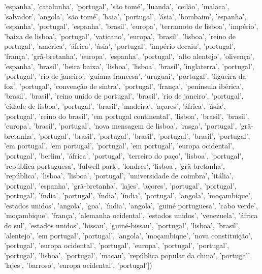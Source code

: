 \documentclass{article}
\begin{document}
\begin{itemize}
'espanha', 'catalunha', 'portugal', 'são tomé', 'luanda', 'ceilão', 'malaca', 'salvador', 'angola', 'são tomé', 'haia', 'portugal', 'ásia', 'bombaim', 'espanha', 'espanha', 'portugal', 'espanha', 'brasil', 'europa', 'terramoto de lisboa', 'império', 'baixa de lisboa', 'portugal', 'vaticano', 'europa', 'brasil', 'lisboa', 'reino de portugal', 'américa', 'áfrica', 'ásia', 'portugal', 'império decaiu', 'portugal', 'frança', 'grã-bretanha', 'europa', 'espanha', 'portugal', 'alto alentejo', 'olivença', 'espanha', 'brasil', 'beira baixa', 'lisboa', 'lisboa', 'brasil', 'inglaterra', 'portugal', 'portugal', 'rio de janeiro', 'guiana francesa', 'uruguai', 'portugal', 'figueira da foz', 'portugal', 'convenção de sintra', 'portugal', 'frança', 'península ibérica', 'brasil', 'brasil', 'reino unido de portugal', 'brasil', 'rio de janeiro', 'portugal', 'cidade de lisboa', 'portugal', 'brasil', 'madeira', 'açores', 'áfrica', 'ásia', 'portugal', 'reino do brasil', 'em portugal continental', 'lisboa', 'brasil', 'brasil', 'europa', 'brasil', 'portugal', 'nova mensagem de lisboa', 'rasga', 'portugal', 'grã-bretanha', 'portugal', 'brasil', 'portugal', 'brasil', 'portugal', 'brasil', 'portugal', 'em portugal', 'em portugal', 'portugal', 'em portugal', 'europa ocidental', 'portugal', 'berlim', 'áfrica', 'portugal', 'terreiro do paço', 'lisboa', 'portugal', 'república portuguesa', 'fulwell park', 'londres', 'lisboa', 'grã-bretanha', 'república', 'lisboa', 'lisboa', 'portugal', 'universidade de coimbra', 'itália', 'portugal', 'espanha', 'grã-bretanha', 'lajes', 'açores', 'portugal', 'portugal', 'portugal', 'índia', 'portugal', 'índia', 'índia', 'portugal', 'angola', 'moçambique', 'estados unidos', 'angola', 'goa', 'índia', 'angola', 'guiné portuguesa', 'cabo verde', 'moçambique', 'frança', 'alemanha ocidental', 'estados unidos', 'venezuela', 'áfrica do sul', 'estados unidos', 'bissau', 'guiné-bissau', 'portugal', 'lisboa', 'brasil', 'alentejo', 'em portugal', 'portugal', 'angola', 'moçambique', 'nova constituição', 'portugal', 'europa ocidental', 'portugal', 'europa', 'portugal', 'portugal', 'portugal', 'lisboa', 'portugal', 'macau', 'república popular da china', 'portugal', 'lajes', 'barroso', 'europa ocidental', 'portugal'])

\end{itemize}
\end{document}
